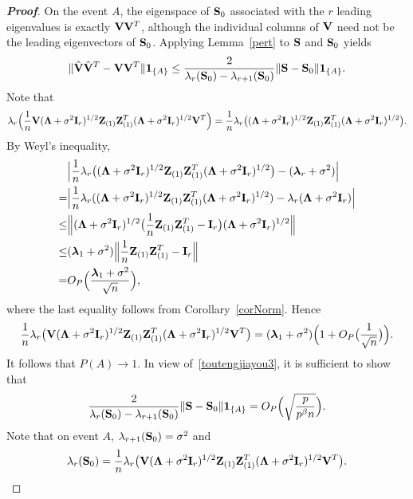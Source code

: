 \documentclass[3p]{elsarticle}
\newcommand{\bZ}{\mathbf{Z}}
\newcommand{\bfsym}[1]{\ensuremath{\boldsymbol{#1}}}
\def\blambda {\bfsym {\lambda}}        \def\bLambda {\bfsym {\Lambda}}
\theoremstyle{plain}
\theoremstyle{definition}
\theoremstyle{remark}
\begin{document}
\begin{appendices}
\begin{proof}[\textbf{Proof}]
        On the event $A$, the eigenspace of $\mathbf{S}_0$ associated with the $r$ leading eigenvalues is exactly $\mathbf{V} \mathbf{V}^T$, although the individual columns of $\mathbf{V}$ need not be the leading eigenvectors of $\mathbf{S}_0$.
    Applying Lemma~\ref{pert} to $\mathbf{S}$ and $\mathbf{S}_0$ yields
    \begin{equation}\label{toutengjiayou3}
    \|\hat{\mathbf{V}}\hat{\mathbf{V}}^T - \mathbf{V}\mathbf{V} ^T\| \mathbf{1}_{\{A\}}\leq
        \frac{2}{\lambda_r(\mathbf{S}_0)-\lambda_{r+1}(\mathbf{S}_0)}\|\mathbf{S}-\mathbf{S}_0\|\mathbf{1}_{\{A\}}.
    \end{equation}
    Note that
$$
        \lambda_r\Big(\frac{1}{n}\BV(\bLambda+\sigma^2\BI_r)^{1/2}\bZ_{(1)} \bZ_{(1)}^T(\bLambda+\sigma^2\BI_r)^{1/2}\BV^T\Big)
    =
        \frac{1}{n}\lambda_r\big((\bLambda+\sigma^2\BI_r)^{1/2}\bZ_{(1)} \bZ_{(1)}^T(\bLambda+\sigma^2\BI_r)^{1/2}\big).
$$
By Weyl's inequality,
$$
    \begin{aligned}
        &\Big|
        \frac{1}{n}\lambda_r\big((\bLambda+\sigma^2 \BI_r)^{1/2}\bZ_{(1)} \bZ_{(1)}^T(\bLambda+\sigma^2 \BI_r)^{1/2}\big)
    -
        (\blambda_r+\sigma^2)
    \Big|\\
        =&\Big|
    \frac{1}{n}\lambda_r((\bLambda+\sigma^2 \BI_r)^{1/2}\bZ_{(1)} \bZ_{(1)}^T(\bLambda+\sigma^2 \BI_r)^{1/2})
    -
    \lambda_r(\bLambda+\sigma^2\BI_r)
    \Big|
        \\
        \leq&
        \Big\|(\bLambda+\sigma^2\BI_r)^{1/2}\big(\frac{1}{n}\bZ_{(1)} \bZ_{(1)}^T-\BI_r\big)(\bLambda+\sigma^2\BI_r)^{1/2}\Big\|\\
        \leq& (\blambda_1+\sigma^2)\Big\|\frac{1}{n}\bZ_{(1)} \bZ_{(1)}^T-\BI_r\Big\|
        \\
        =& O_P\Big(\frac{\blambda_1+\sigma^2}{\sqrt{n}}\Big),
    \end{aligned}
$$
    where the last equality follows from Corollary~\ref{corNorm}.
    Hence
$$
        \frac{1}{n}\lambda_r\big(\BV(\bLambda+\sigma^2 \BI_r)^{1/2}\bZ_{(1)} \bZ_{(1)}^T(\bLambda+\sigma^2 \BI_r)^{1/2}\BV^T\big)
        =(\blambda_1+\sigma^2)\Big(1+O_P\big(\frac{1}{\sqrt{n}}\big)\Big).
        $$
        It follows that $P(A)\to 1$.
        In view of~\eqref{toutengjiayou3}, it is sufficient to show that
        $$
        \frac{2}{\lambda_r(\mathbf{S}_0)-\lambda_{r+1}(\mathbf{S}_0)}\|\mathbf{S}-\mathbf{S}_0\|\mathbf{1}_{\{A\}}=O_P\Big(\sqrt{\frac{p}{p^{\beta}n }}\Big).
        $$
        Note that on event $A$, $\lambda_{r+1}(\mathbf{S}_0)=\sigma^2$ and
        $$\lambda_r(\BS_0)=\frac{1}{n}\lambda_r\big(\BV(\bLambda+\sigma^2 \BI_r)^{1/2}\bZ_{(1)} \bZ_{(1)}^T(\bLambda+\sigma^2 \BI_r)^{1/2}\BV^T\big).$$

\end{proof}
\end{appendices}
\end{document}
